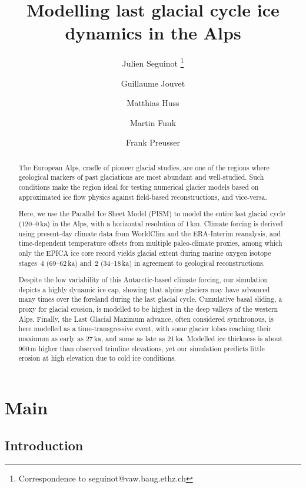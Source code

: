 \documentclass{article}
\title{Modelling last glacial cycle ice dynamics in the Alps}
\author[1]{Julien Seguinot%
           \thanks{Correspondence to seguinot@vaw.baug.ethz.ch}}
\author[1]{Guillaume Jouvet}
\author[1]{Matthias Huss}
\author[1]{Martin Funk}
\author[2]{Frank Preusser}
\affil[1]{Laboratory of Hydraulics, Hydrology and Glaciology,
          ETH Zürich, Switzerland}
\affil[2]{Institute of Earth and Environmental Sciences,
          University of Freiburg, Germany}
\begin{document}

\maketitle

\begin{abstract}

    The European Alps, cradle of pioneer glacial studies, are one of the
    regions where geological markers of past glaciations are most abundant and
    well-studied. Such conditions make the region ideal for testing numerical
    glacier models based on approximated ice flow physics against field-based
    reconstructions, and vice-versa.

    Here, we use the Parallel Ice Sheet Model (PISM) to model the entire last
    glacial cycle (120--0\,ka) in the Alps, with a horizontal resolution of
    1\,km. Climate forcing is derived using present-day climate data from
    WorldClim and the ERA-Interim reanalysis, and time-dependent temperature
    offsets from multiple paleo-climate proxies, among which only the EPICA ice
    core record yields glacial extent during marine oxygen isotope stages~4
    (69--62\,ka) and~2 (34--18\,ka) in agreement to geological reconstructions.

    Despite the low variability of this Antarctic-based climate forcing, our
    simulation depicts a highly dynamic ice cap, showing that alpine glaciers
    may have advanced many times over the foreland during the last glacial
    cycle. Cumulative basal sliding, a proxy for glacial erosion, is modelled
    to be highest in the deep valleys of the western Alps. Finally, the Last
    Glacial Maximum advance, often considered synchronous, is here modelled as
    a time-transgressive event, with some glacier lobes reaching their maximum
    as early as 27\,ka, and some as late as 21\,ka. Modelled ice thickness is
    about 900\,m higher than observed trimline elevations, yet our simulation
    predicts little erosion at high elevation due to cold ice conditions.

\end{abstract}

\section{Main}
\subsection{Introduction}
\end{document}
